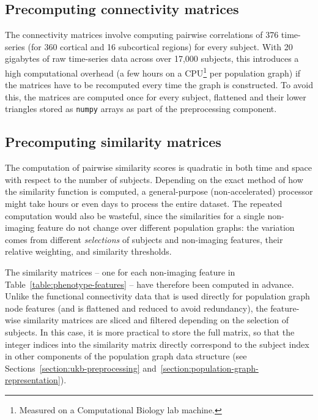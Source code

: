
\subsection{Precomputing connectivity matrices}
The connectivity matrices involve computing pairwise correlations of 376 time-series (for 360 cortical and 16 subcortical regions) for every subject. With 20 gigabytes of raw time-series data across over 17,000 subjects, this introduces a high computational overhead (a few hours on a CPU\footnote{Measured on a Computational Biology lab machine.} per population graph) if the matrices have to be recomputed every time the graph is constructed. To avoid this, the matrices are computed once for every subject, flattened and their lower triangles stored as \texttt{numpy} arrays as part of the preprocessing component.


\subsection{Precomputing similarity matrices}
The computation of pairwise similarity scores is quadratic in both time and space with respect to the number of subjects. Depending on the exact method of how the similarity function is computed, a general-purpose (non-accelerated) processor might take hours or even days to process the entire dataset. The repeated computation would also be wasteful, since the similarities for a single non-imaging feature do not change over different population graphs: the variation comes from different \textit{selections} of subjects and non-imaging features, their relative weighting, and similarity thresholds.

The similarity matrices – one for each non-imaging feature in Table~\ref{table:phenotype-features} – have therefore been computed in advance. Unlike the functional connectivity data that is used directly for population graph node features (and is flattened and reduced to avoid redundancy), the feature-wise similarity matrices are sliced and filtered depending on the selection of subjects. In this case, it is more practical to store the full matrix, so that the integer indices into the similarity matrix directly correspond to the subject index in other components of the population graph data structure (see Sections~\ref{section:ukb-preprocessing} and~\ref{section:population-graph-representation}).

